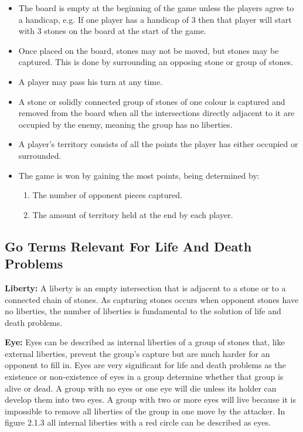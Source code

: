 \documentclass{l3proj}
\begin{document}
\begin{itemize}
\item The board is empty at the beginning of the game unless the players agree to a handicap, e.g. If one player has a handicap of 3 then that player will start with 3 stones on the board at the start of the game.
\item Once placed on the board, stones may not be moved, but stones may be captured. This is done by surrounding an opposing stone or group of stones. 
\item A player may pass his turn at any time.
\item A stone or solidly connected group of stones of one colour is captured and removed from the board when all the intersections directly adjacent to it are occupied by the enemy, meaning the group has no liberties.
\item A player's territory consists of all the points the player has either occupied or surrounded.
\item  The game is won by gaining the most points, being determined by:
\begin{enumerate}
\item The number of opponent pieces captured.
\item The amount of territory held at the end by each player.
\end{enumerate}
\end{itemize}

\subsection{Go Terms Relevant For Life And Death Problems}

\textbf{Liberty:} A liberty is an empty intersection that is adjacent to a stone or to a connected chain of stones. As capturing stones occurs when opponent stones have no liberties, the number of liberties is fundamental to the solution of life and death problems.  

\textbf{Eye:} Eyes can be described as internal liberties of a group of stones that, like external liberties, prevent the group's capture but are much harder for an opponent to fill in. Eyes are very significant for life and death problems as the existence or non-existence of eyes in a group determine whether that group is alive or dead. A group with no eyes or one eye will die unless its holder can develop them into two eyes. A group with two or more eyes will live because it is impossible to remove all liberties of the group in one move by the attacker. In figure 2.1.3 all internal liberties with a red circle can be described as eyes.
\end{document}

